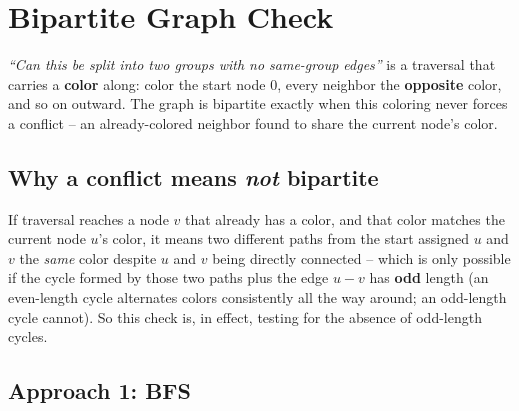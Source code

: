 \section{Bipartite Graph Check}
\label{sec:graph-bipartite}


\begin{patternbox}
\emph{``Can this be split into two groups with no same-group edges''}
is a traversal that carries a \textbf{color} along: color the start
node $0$, every neighbor the \textbf{opposite} color, and so on
outward. The graph is bipartite exactly when this coloring never
forces a conflict -- an already-colored neighbor found to share the
current node's color.
\end{patternbox}

\subsection*{Why a conflict means \emph{not} bipartite}

If traversal reaches a node $v$ that already has a color, and that
color matches the current node $u$'s color, it means two different
paths from the start assigned $u$ and $v$ the \emph{same} color despite
$u$ and $v$ being directly connected -- which is only possible if the
cycle formed by those two paths plus the edge $u{-}v$ has \textbf{odd}
length (an even-length cycle alternates colors consistently all the
way around; an odd-length cycle cannot). So this check is, in effect,
testing for the absence of odd-length cycles.

\subsection*{Approach 1: BFS}

